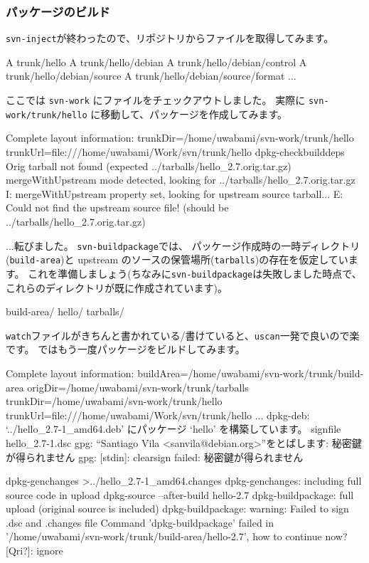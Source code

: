 \documentclass[mingoth,a4paper]{jsarticle}
\begin{document}
\subsubsection{パッケージのビルド}

{\tt{svn-inject}}が終わったので、リポジトリからファイルを取得してみます。
\begin{commandline}
  A    trunk/hello
  A    trunk/hello/debian
  A    trunk/hello/debian/control
  A    trunk/hello/debian/source
  A    trunk/hello/debian/source/format
  ...
\end{commandline}
ここでは {\tt{svn-work}} にファイルをチェックアウトしました。
実際に {\tt{svn-work/trunk/hello}} に移動して、パッケージを作成してみます。
\begin{commandline}
  Complete layout information:
          trunkDir=/home/uwabami/svn-work/trunk/hello
          trunkUrl=file:///home/uwabami/Work/svn/trunk/hello
  dpkg-checkbuilddeps
  Orig tarball not found (expected ../tarballs/hello_2.7.orig.tar.gz)
  mergeWithUpstream mode detected, looking for ../tarballs/hello_2.7.orig.tar.gz
  I: mergeWithUpstream property set, looking for upstream source tarball...
  E: Could not find the upstream source file! (should be ../tarballs/hello_2.7.orig.tar.gz)
\end{commandline}
...転びました。
{\tt{svn-buildpackage}}では、
パッケージ作成時の一時ディレクトリ({\tt{build-area}})と
upstream のソースの保管場所({\tt{tarballs}})の存在を仮定しています。
これを準備しましょう(ちなみに{\tt{svn-buildpackage}}は失敗しました時点で、これらのディレクトリが既に作成されています)。
\begin{commandline}
  build-area/  hello/  tarballs/
\end{commandline}
{\tt{watch}}ファイルがきちんと書かれている/書けていると、{\tt{uscan}}一発で良いので楽です。
ではもう一度パッケージをビルドしてみます。
\begin{commandline}
  Complete layout information:
        buildArea=/home/uwabami/svn-work/trunk/build-area
        origDir=/home/uwabami/svn-work/trunk/tarballs
        trunkDir=/home/uwabami/svn-work/trunk/hello
        trunkUrl=file:///home/uwabami/Work/svn/trunk/hello
  ...
  dpkg-deb: `../hello_2.7-1_amd64.deb' にパッケージ `hello' を構築しています。
  signfile hello_2.7-1.dsc
  gpg: “Santiago Vila <sanvila@debian.org>”をとばします: 秘密鍵が得られません
  gpg: [stdin]: clearsign failed: 秘密鍵が得られません

  dpkg-genchanges  >../hello_2.7-1_amd64.changes
  dpkg-genchanges: including full source code in upload
  dpkg-source --after-build hello-2.7
  dpkg-buildpackage: full upload (original source is included)
  dpkg-buildpackage: warning: Failed to sign .dsc and .changes file
  Command 'dpkg-buildpackage' failed in '/home/uwabami/svn-work/trunk/build-area/hello-2.7',
  how to continue now? [Qri?]: ignore
\end{commandline}
\end{document}
